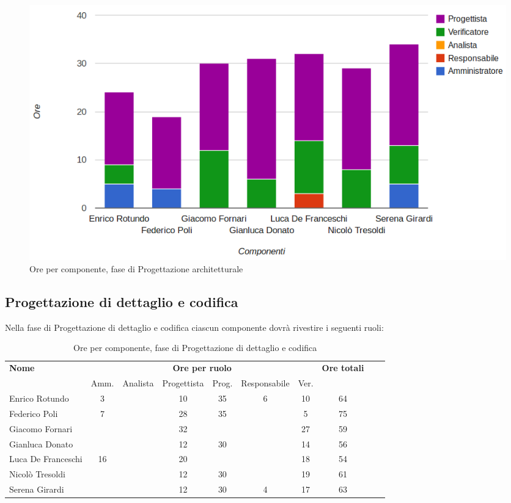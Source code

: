 \begin{figure}[H]
\centering
\includegraphics[scale=0.35]{4-2.png}
\caption{Ore per componente, fase di Progettazione architetturale\label{fig:nome}}
\end{figure}

\pagebreak
\subsection{Progettazione di dettaglio e codifica}

Nella fase di Progettazione di dettaglio e codifica ciascun componente dovrà rivestire i seguenti ruoli:

\begin{table}[H]
\centering
\begin{tabular}{lccccccccc}
\toprule 
    \textbf{Nome}  & \multicolumn{6}{c}{\textbf{Ore per ruolo}} & \textbf{Ore totali}\\
    & Amm. & Analista & Progettista
    & Prog. & Responsabile & Ver. \\
    \midrule
    Enrico Rotundo   	& 3 &  &	 10	& 35 & 6 & 10 &	64 \\
    Federico Poli  		& 7	&  &	 28	& 35 &   & 5  & 75 \\
    Giacomo Fornari		& 	&  &	 32	&    &   & 27 & 59 \\
    Gianluca Donato 		& 	&  &	 12	& 30 &   & 14 & 56 \\
    Luca De Franceschi 	& 16	&  &	 20	&    &   & 18 & 54 \\
    Nicolò Tresoldi 		& 	&  &	 12	& 30 &   & 19 & 61 \\
   	Serena Girardi 		& 	&  &	 12	& 30 & 4 & 17 & 63 \\
    
    \bottomrule
\end{tabular}
\caption{Ore per componente, fase di Progettazione di dettaglio e codifica}
\end{table}

